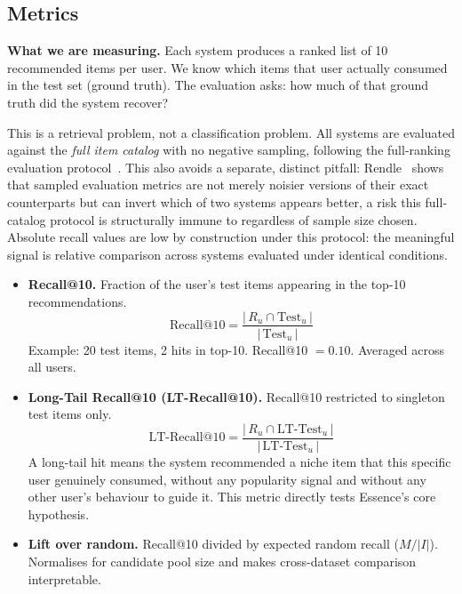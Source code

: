 \documentclass[11pt,a4paper]{article}
\begin{document}
\subsection{Metrics}

\textbf{What we are measuring.} Each system produces a ranked list of 10
recommended items per user. We know which items that user actually consumed
in the test set (ground truth). The evaluation asks: how much of that ground
truth did the system recover?

This is a retrieval problem, not a classification problem. All systems are
evaluated against the \emph{full item catalog} with no negative sampling,
following the full-ranking evaluation protocol~\cite{krichene2020}. This
also avoids a separate, distinct pitfall: Rendle~\cite{rendle2019} shows
that sampled evaluation metrics are not merely noisier versions of their
exact counterparts but can invert which of two systems appears better, a
risk this full-catalog protocol is structurally immune to regardless of
sample size chosen. Absolute
recall values are low by construction under this protocol: the meaningful
signal is relative comparison across systems evaluated under identical
conditions.

\begin{itemize}[leftmargin=*, itemsep=3pt]
  \item \textbf{Recall@10.} Fraction of the user's test items appearing in
        the top-10 recommendations.
        \[
          \text{Recall@10} = \frac{|\,R_u \cap \text{Test}_u\,|}{|\,\text{Test}_u\,|}
        \]
        Example: 20 test items, 2 hits in top-10. Recall@10 $= 0.10$.
        Averaged across all users.

  \item \textbf{Long-Tail Recall@10 (LT-Recall@10).} Recall@10 restricted to
        singleton test items only.
        \[
          \text{LT-Recall@10} =
          \frac{|\,R_u \cap \text{LT-Test}_u\,|}{|\,\text{LT-Test}_u\,|}
        \]
        A long-tail hit means the system recommended a niche item that this
        specific user genuinely consumed, without any popularity signal
        and without any other user's behaviour to guide it. This metric
        directly tests Essence's core hypothesis.

  \item \textbf{Lift over random.} Recall@10 divided by expected random
        recall ($M / |I|$). Normalises for candidate pool size and makes
        cross-dataset comparison interpretable.
\end{itemize}
\end{document}
